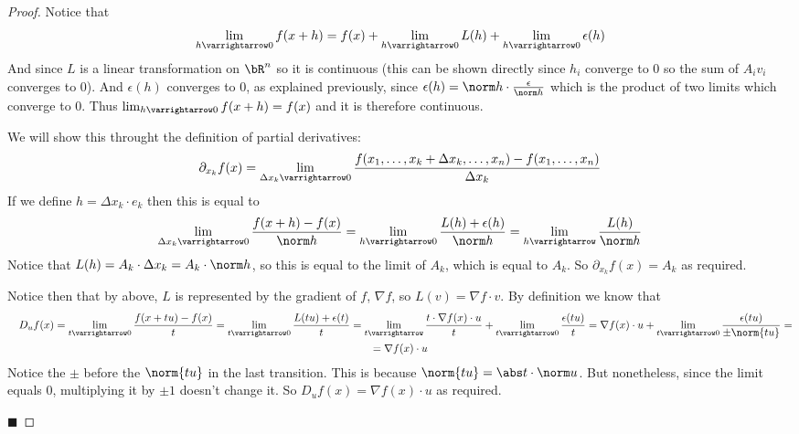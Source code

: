 \documentclass[10pt]{article}
\begin{document}
\begin{proof}

    \benum
        \item Notice that
        \[ \lim_{h\varrightarrow0}f(x+h) = f(x) + \lim_{h\varrightarrow0}L(h) + \lim_{h\varrightarrow0}\epsilon(h) \]
        And since $L$ is a linear transformation on $\bR^n$ so it is continuous (this can be shown directly since $h_i$ converge to $0$ so the sum of $A_iv_i$ converges to $0$).
        And $\epsilon(h)$ converges to $0$, as explained previously, since $\epsilon(h)=\norm h\cdot\frac\epsilon{\norm h}$ which is the product of two limits which converge to $0$.
        Thus $\lim_{h\varrightarrow0}f(x+h)=f(x)$ and it is therefore continuous.

        \item We will show this throught the definition of partial derivatives:
        \[ \partial_{x_k}f(x) = \lim_{\Delta x_k\varrightarrow0}\frac{f(x_1,\dots,x_k+\Delta x_k,\dots,x_n)-f(x_1,\dots,x_n)}{\Delta x_k} \]
        If we define $h=\Delta x_k\cdot e_k$ then this is equal to
        \[ \lim_{\Delta x_k\varrightarrow0}\frac{f(x+h)-f(x)}{\norm h} = \lim_{h\varrightarrow0}\frac{L(h)+\epsilon(h)}{\norm h} = \lim_{h\varrightarrow}\frac{L(h)}{\norm h} \]
        Notice that $L(h)=A_k\cdot\Delta x_k=A_k\cdot\norm h$, so this is equal to the limit of $A_k$, which is equal to $A_k$.
        So $\partial_{x_k}f(x)=A_k$ as required.

        \item Notice then that by above, $L$ is represented by the gradient of $f$, $\nabla f$, so $L(v)=\nabla f\cdot v$.
        By definition we know that
        \begin{gather*}
        \quad D_uf(x) = \lim_{t\varrightarrow0}\frac{f(x+tu)-f(x)}t = \lim_{t\varrightarrow0}\frac{L(tu)+\epsilon(t)}t = \lim_{t\varrightarrow}\frac{t\cdot\nabla f(x)\cdot u}t +
        \lim_{t\varrightarrow0}\frac{\epsilon(tu)}t = \nabla f(x)\cdot u + \lim_{t\varrightarrow0}\frac{\epsilon(tu)}{\pm\norm{tu}} = \\
        = \nabla f(x)\cdot u
        \end{gather*}
        Notice the $\pm$ before the $\norm{tu}$ in the last transition.
        This is because $\norm{tu}=\abs t\cdot\norm u$.
        But nonetheless, since the limit equals $0$, multiplying it by $\pm1$ doesn't change it.
        So $D_uf(x)=\nabla f(x)\cdot u$ as required.
    \eenum

    \hfill$\blacksquare$

\end{proof}
\end{document}
